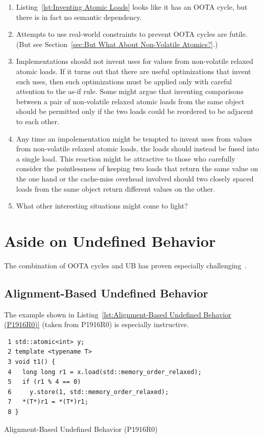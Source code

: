 \documentclass[10]{article}
\begin{document}
\begin{enumerate}
\item	Listing~\ref{lst:Inventing Atomic Loads}
	looks like it has an OOTA cycle, but there is in fact no
	semantic dependency.
\item	Attempts to use real-world constraints to prevent OOTA cycles
	are futile.
	(But see Section~\ref{sec:But What About Non-Volatile Atomics?}.)
\item	Implementations should not invent uses for values from
	non-volatile relaxed atomic loads.
	If it turns out that there are useful optimizations that invent
	such uses, then such optimizations must be applied only with
	careful attention to the as-if rule.
	Some might argue that inventing comparisons between a pair of
	non-volatile relaxed atomic loads from the same object should
	be permitted only if the two loads could be reordered to be
	adjacent to each other.
\item	Any time an impolementation might be tempted to invent uses from
	values from non-volatile relaxed atomic loads, the loads should
	instead be fused into a single load.
	This reaction might be attractive to those who carefully consider
	the pointlessness of keeping two loads that return the same value
	on the one hand or the cache-miss overhead involved should two
	closely spaced loads from the same object return different values
	on the other.
\item	What other interesting situations might come to light?
\end{enumerate}

\clearpage

\section{Aside on Undefined Behavior}
\label{app:Aside on Undefined Behavior}

The combination of OOTA cycles and UB has proven especially
challenging~\cite{DavidGoldblatt2019NoElegantOOTAfix}.

\subsection{Alignment-Based Undefined Behavior}
\label{sec:Alignment-Based Undefined Behavior}

The example shown in
Listing~\ref{lst:Alignment-Based Undefined Behavior (P1916R0)}
(taken from P1916R0) is especially instructive.

\begin{listing}[tbp]
\begin{verbatim}
 1 std::atomic<int> y;
 2 template <typename T>
 3 void t1() {
 4   long long r1 = x.load(std::memory_order_relaxed);
 5   if (r1 % 4 == 0)
 6     y.store(1, std::memory_order_relaxed);
 7   *(T*)r1 = *(T*)r1;
 8 }
\end{verbatim}
\caption{Alignment-Based Undefined Behavior (P1916R0)}
\label{lst:Alignment-Based Undefined Behavior (P1916R0)}
\end{listing}
\end{document}
